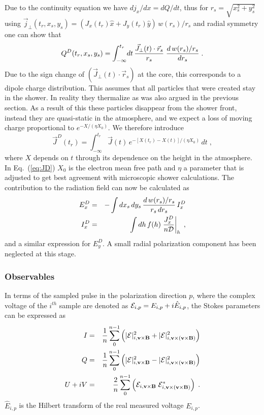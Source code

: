 \documentclass[pdftex,dvipsnames,usenames,fleqn,12pt]{article}
\def\vB{{\bf{v}\times\bf{B}}}
\def\vvB{{\bf{v}\times\left(\bf{v}\times\bf{B}\right)}}
\def\beq{\begin{equation}}
\def\eeq{\end{equation} }
\def\bea{\begin{eqnarray}}
\def\eea{\end{eqnarray}}
\def\eqref#1{Eq.~(\ref{eq:#1})}
\def\eqlab#1{\label{eq:#1}}
\begin{document}
Due to the continuity equation we have $d j_x/dx =dQ/dt$, thus for $r_s=\sqrt{x_s^2+y_s^2}$ using $\vec{j}_\perp(t_r,x_s,y_s)=(J_x(t_r) \hat{x} + J_y(t_r) \hat{y} )\, w(r_s)/r_s $ and radial symmetry one can show that
\beq
Q^D(t_r,x_s,y_s)%
= \int_{-\infty}^{t_r} \! dt \,{\vec{J}_\perp(t)\cdot \vec{r}_s \over r_s}\; {d\, w(r_s)/r_s \over dr_s} \;. \eqlab{QD}
\eeq
Due to the sign change of $\left(\vec{J}_\perp(t)\cdot \vec{r}_s\right)$ at the core, this
corresponds to a dipole charge distribution. This assumes that all particles that were created stay in the shower. In reality they thermalize as was also argued in the previous section.
As a result of this these particles disappear from the shower front, instead they are quasi-static in the atmosphere, and we expect a loss of moving charge proportional to $e^{-X/(\eta X_0)}$. We therefore introduce
\beq
\vec{J}^D(t_r)=\int_{-\infty}^{t_r} \vec{J}(t) \,e^{-[X(t_r)-X(t)]/(\eta X_0)}\,dt \;,
\eqlab{JD}
\eeq
where $X$ depends on $t$ through its dependence on the height in the atmosphere. In \eqref{JD} $X_0$ is the electron mean free path and $\eta$ a parameter that is adjusted to get best agreement with microscopic shower calculations.
The contribution to the radiation field can now be calculated as
\bea
E_x^D &=& -\int dx_s\,dy_s\,{d\, w(r_s)/r_s \over r_s\, dr_s}\, I^D_x\\
 I^D_x &=& \int dh \, f(h) \left. {J^D_x\over n{\cal D}} \right|_{h} \;,
\eea
and a similar expression for $E_y^D$. A small radial polarization component has been neglected at this stage.

\subsubsection{Observables}

In terms of the sampled pulse in the polarization direction $p$, where the complex voltage of the $i^{th}$ sample are denoted as ${\cal E}_{i,p}=E_{i,p} + i\hat{E}_{i,p}$, the Stokes parameters can be expressed as
\begin{eqnarray}
I&=&{1\over n} \sum_0^{n-1} \left( |{\cal E}|^2_{i,\vB} + |{\cal E}|^2_{i,\vvB} \right) \nonumber\\
Q&=&{1\over n} \sum_0^{n-1} \left( |{\cal E}|^2_{i,\vB} - |{\cal E}|^2_{i,\vvB} \right) \nonumber\\
U +iV&=&{2\over n} \sum_0^{n-1} \left( {\cal E}_{i,\vB} \;  {\cal E}_{i,\vvB}^* \right) \;.
\eqlab{Stokes}
\end{eqnarray}
$\hat{E}_{i,p}$ is the Hilbert transform of the real measured voltage $E_{i,p}$.
\end{document}
